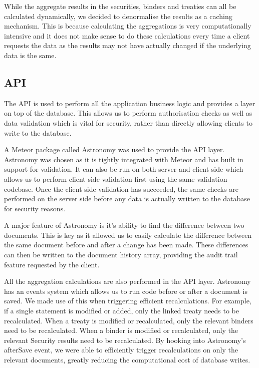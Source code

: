 \documentclass[12pt]{article}
\begin{document}
While the aggregate results in the securities, binders and treaties can all be calculated dynamically, we decided to denormalise the results as a caching mechanism. This is because calculating the aggregations is very computationally intensive and it does not make sense to do these calculations every time a client requests the data as the results may not have actually changed if the underlying data is the same.

\subsection{API}
The API is used to perform all the application business logic and provides a layer on top of the database. This allows us to perform authorisation checks as well as data validation which is vital for security, rather than directly allowing clients to write to the database.

A Meteor package called Astronomy\cite{astronomy} was used to provide the API layer. Astronomy was chosen as it is tightly integrated with Meteor and has built in support for validation. It can also be run on both server and client side which allows us to perform client side validation first using the same validation codebase. Once the client side validation has succeeded, the same checks are performed on the server side before any data is actually written to the database for security reasons.

A major feature of Astronomy is it's ability to find the difference between two documents. This is key as it allowed us to easily calculate the difference between the same document before and after a change has been made. These differences can then be written to the document history array, providing the audit trail feature requested by the client.

All the aggregation calculations are also performed in the API layer. Astronomy has an events system which allows us to run code before or after a document is saved. We made use of this when triggering efficient recalculations. For example, if a single statement is modified or added, only the linked treaty needs to be recalculated. When a treaty is modified or recalculated, only the relevant binders need to be recalculated. When a binder is modified or recalculated, only the relevant Security results need to be recalculated. By hooking into Astronomy's afterSave event, we were able to efficiently trigger recalculations on only the relevant documents, greatly reducing the computational cost of database writes.
\end{document}
